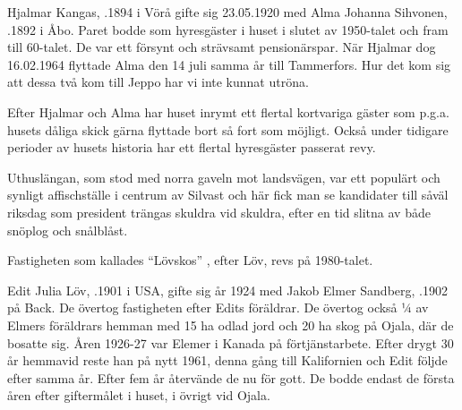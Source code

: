 \begin{jhchildren}
  \item {}
  \item {}
\end{jhchildren}



Hjalmar Kangas, .1894 i Vörå gifte sig 23.05.1920 med Alma Johanna Sihvonen, .1892 i Åbo. Paret bodde som hyresgäster i huset i slutet av 1950-talet och fram till 60-talet. De var ett försynt och strävsamt pensionärspar. När Hjalmar dog 16.02.1964 flyttade Alma den 14 juli samma år till Tammerfors. Hur det kom sig att dessa två kom till Jeppo har vi inte kunnat utröna.

Efter Hjalmar och Alma har huset inrymt ett flertal kortvariga gäster som p.g.a. husets dåliga skick gärna flyttade bort så fort som möjligt. Också under tidigare perioder av husets historia har ett flertal hyresgäster passerat revy.

Uthuslängan, som stod med norra gaveln mot landsvägen, var ett populärt och synligt affischställe i centrum av Silvast och här fick man se kandidater till såväl riksdag som president trängas skuldra vid skuldra, efter en tid slitna av både snöplog och snålblåst.

Fastigheten som kallades ``Lövskos'' , efter Löv,  revs på 1980-talet.


Edit Julia Löv, .1901 i USA, gifte sig år 1924 med Jakob Elmer Sandberg, .1902 på Back. De övertog fastigheten efter Edits föräldrar. De övertog också ¼ av Elmers föräldrars hemman med 15 ha odlad jord och 20 ha skog på Ojala, där de bosatte sig. Åren 1926-27 var Elemer i Kanada på förtjänstarbete. Efter drygt 30 år hemmavid reste han på nytt 1961, denna gång till Kalifornien och Edit följde efter samma år. Efter fem år återvände de nu för gott. De bodde endast de första åren efter giftermålet i huset, i övrigt vid Ojala.

\begin{jhchildren}
  \item {}
  \item {}
  \item {}
\end{jhchildren}

